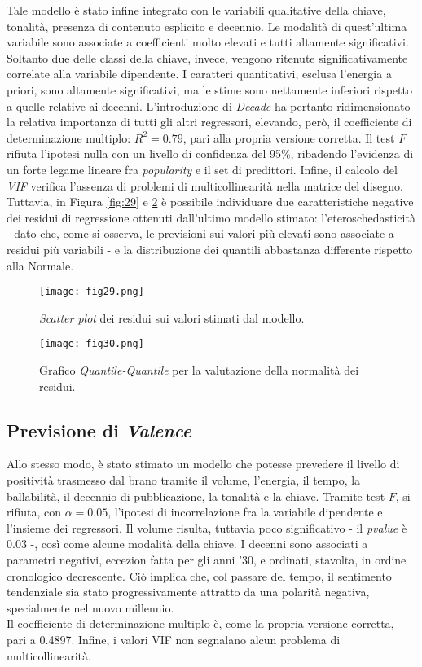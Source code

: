 \documentclass[fleqn,10pt]{SelfArx} %
\begin{document}
Tale modello è stato infine integrato con le variabili qualitative della chiave, tonalità, presenza di contenuto esplicito e decennio. Le modalità di quest'ultima variabile sono associate a coefficienti molto elevati e tutti altamente significativi. Soltanto due delle classi della chiave, invece, vengono ritenute significativamente correlate alla variabile dipendente. I caratteri quantitativi, esclusa l'energia a priori, sono altamente significativi, ma le stime sono nettamente inferiori rispetto a quelle relative ai decenni. L'introduzione di \textit{Decade} ha pertanto ridimensionato la relativa importanza di tutti gli altri regressori, elevando, però, il coefficiente di determinazione multiplo: $R^2=0.79$, pari alla propria versione corretta. Il test $F$ rifiuta l'ipotesi nulla con un livello di confidenza del 95\%, ribadendo l'evidenza di un forte legame lineare fra \textit{popularity} e il set di predittori. Infine, il calcolo del \textit{VIF} verifica l'assenza di problemi di multicollinearità nella matrice del disegno.\\
Tuttavia, in Figura \ref{fig:29} e \ref{fig:fig30} è possibile individuare due caratteristiche negative dei residui di regressione ottenuti dall'ultimo modello stimato: l'eteroschedasticità - dato che, come si osserva, le previsioni sui valori più elevati sono associate a residui più variabili - e la distribuzione dei quantili abbastanza differente rispetto alla Normale.
\begin{figure}[h]
    \centering
    \texttt{[image: fig29.png]}
    \caption{\textit{Scatter plot} dei residui sui valori stimati dal modello.}
    \label{fig:fig29}
\end{figure}
\begin{figure}[h]
    \centering
    \texttt{[image: fig30.png]}
    \caption{Grafico \textit{Quantile-Quantile} per la valutazione della normalità dei residui.}
    \label{fig:fig30}
\end{figure}

\subsection{Previsione di \textit{Valence}}
Allo stesso modo, è stato stimato un modello che potesse prevedere il livello di positività trasmesso dal brano tramite il volume, l'energia, il tempo, la ballabilità, il decennio di pubblicazione, la tonalità e la chiave. Tramite test $F$, si rifiuta, con $\alpha=0.05$, l'ipotesi di incorrelazione fra la variabile dipendente e l’insieme dei regressori. Il volume risulta, tuttavia poco significativo - il \textit{pvalue} è 0.03 -, così come alcune modalità della chiave. I decenni sono associati a parametri negativi, eccezion fatta per gli anni '30, e ordinati, stavolta, in ordine cronologico decrescente. Ciò implica che, col passare del tempo, il sentimento tendenziale sia stato progressivamente attratto da una polarità negativa, specialmente nel nuovo millennio.\\
Il coefficiente di determinazione multiplo è, come la propria versione corretta, pari a 0.4897. Infine, i valori VIF non segnalano alcun problema di multicollinearità.
\end{document}
